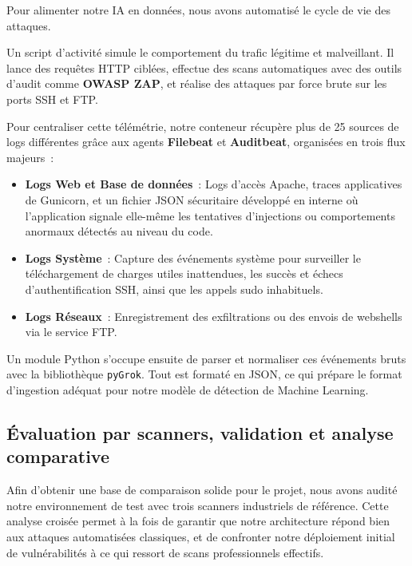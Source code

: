 \documentclass[runningheads]{llncs}
\begin{document}
Pour alimenter notre IA en données, nous avons automatisé le cycle de vie des attaques.

Un script d'activité simule le comportement du trafic légitime et malveillant. Il lance des requêtes HTTP ciblées, effectue des scans automatiques avec des outils d'audit comme \textbf{OWASP ZAP}, et réalise des attaques par force brute sur les ports SSH et FTP.

Pour centraliser cette télémétrie, notre conteneur récupère plus de 25 sources de logs différentes grâce aux agents \textbf{Filebeat} et \textbf{Auditbeat}, organisées en trois flux majeurs~:
\begin{itemize}[nosep]
    \item \textbf{Logs Web et Base de données}~: Logs d'accès Apache, traces applicatives de Gunicorn, et un fichier JSON sécuritaire développé en interne où l'application signale elle-même les tentatives d'injections ou comportements anormaux détectés au niveau du code.
    \item \textbf{Logs Système}~: Capture des événements système pour surveiller le téléchargement de charges utiles inattendues, les succès et échecs d'authentification SSH, ainsi que les appels sudo inhabituels.
    \item \textbf{Logs Réseaux}~: Enregistrement des exfiltrations ou des envois de webshells via le service FTP.
\end{itemize}

Un module Python s'occupe ensuite de parser et normaliser ces événements bruts avec la bibliothèque \texttt{pyGrok}. Tout est formaté en JSON, ce qui prépare le format d'ingestion adéquat pour notre modèle de détection de Machine Learning.

\subsection{Évaluation par scanners, validation et analyse comparative}

Afin d'obtenir une base de comparaison solide pour le projet, nous avons audité notre environnement de test avec trois scanners industriels de référence. Cette analyse croisée permet à la fois de garantir que notre architecture répond bien aux attaques automatisées classiques, et de confronter notre déploiement initial de vulnérabilités à ce qui ressort de scans professionnels effectifs.
\end{document}
